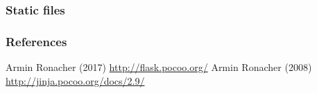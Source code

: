 \documentclass{beamer}
\begin{document}
\begin{frame}
  \frametitle{Static files}

  \begin{figure}
    
    \caption{}
  \end{figure}

\end{frame}

\begin{frame}
\frametitle{References}
\footnotesize{
\begin{thebibliography}{99} %
   Armin Ronacher (2017)
  \newblock \url{http://flask.pocoo.org/}
   Armin Ronacher (2008)
  \newblock \url{http://jinja.pocoo.org/docs/2.9/}

\end{thebibliography}
}
\end{frame}
\end{document}
